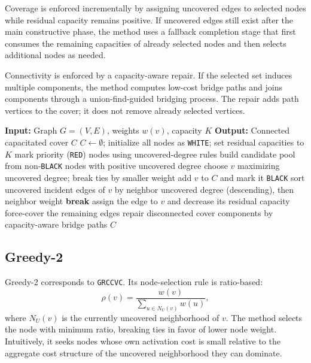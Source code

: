 \documentclass[11pt]{article}
\begin{document}
Coverage is enforced incrementally by assigning uncovered edges to selected nodes while residual capacity remains positive. If uncovered edges still exist after the main constructive phase, the method uses a fallback completion stage that first consumes the remaining capacities of already selected nodes and then selects additional nodes as needed.

Connectivity is enforced by a capacity-aware repair. If the selected set induces multiple components, the method computes low-cost bridge paths and joins components through a union-find-guided bridging process. The repair adds path vertices to the cover; it does not remove already selected vertices.

\begin{algorithm}[h]
\caption{Greedy-1 / GCCVC}
\begin{algorithmic}[1]
\State \textbf{Input:} Graph \(G=(V,E)\), weights \(w(v)\), capacity \(K\)
\State \textbf{Output:} Connected capacitated cover \(C\)
\State \(C\gets \emptyset\); initialize all nodes as \texttt{WHITE}; set residual capacities to \(K\)
    \State mark priority (\texttt{RED}) nodes using uncovered-degree rules
    \State build candidate pool from non-\texttt{BLACK} nodes with positive uncovered degree
    \State choose \(v\) maximizing uncovered degree; break ties by smaller weight
    \State add \(v\) to \(C\) and mark it \texttt{BLACK}
    \State sort uncovered incident edges of \(v\) by neighbor uncovered degree (descending), then neighbor weight
            \State \textbf{break}
        \EndIf
        \State assign the edge to \(v\) and decrease its residual capacity
    \EndFor
\EndWhile
{}
    \State force-cover the remaining edges
\EndIf
\State repair disconnected cover components by capacity-aware bridge paths
\State \Return \(C\)
\end{algorithmic}
\end{algorithm}

\subsection{Greedy-2}

Greedy-2 corresponds to \texttt{GRCCVC}. Its node-selection rule is ratio-based:
\[
\rho(v)=\frac{w(v)}{\sum_{u\in N_U(v)} w(u)},
\]
where \(N_U(v)\) is the currently uncovered neighborhood of \(v\). The method selects the node with minimum ratio, breaking ties in favor of lower node weight. Intuitively, it seeks nodes whose own activation cost is small relative to the aggregate cost structure of the uncovered neighborhood they can dominate.
\end{document}
